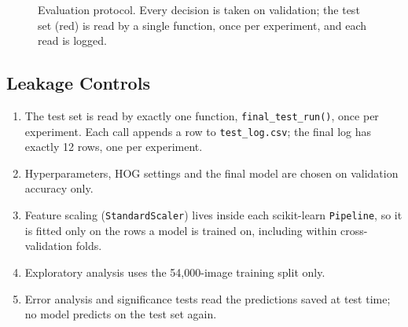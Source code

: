 \documentclass[conference]{IEEEtran}
\begin{document}
\begin{figure}[t]
\centering
{}
\caption{Evaluation protocol. Every decision is taken on validation; the test set (red) is read by a single function,
once per experiment, and each read is logged.}
\label{fig:protocol}
\end{figure}

\subsection{Leakage Controls}
\begin{enumerate}
  \item The test set is read by exactly one function, \texttt{final\_test\_run()}, once per experiment. Each call appends a
        row to \texttt{test\_log.csv}; the final log has exactly 12 rows, one per experiment.
  \item Hyperparameters, HOG settings and the final model are chosen on validation accuracy only.
  \item Feature scaling (\texttt{StandardScaler}) lives inside each scikit-learn \texttt{Pipeline}, so it is fitted only on
        the rows a model is trained on, including within cross-validation folds.
  \item Exploratory analysis uses the 54{,}000-image training split only.
  \item Error analysis and significance tests read the predictions saved at test time; no model predicts on the test
        set again.
\end{enumerate}
\end{document}
